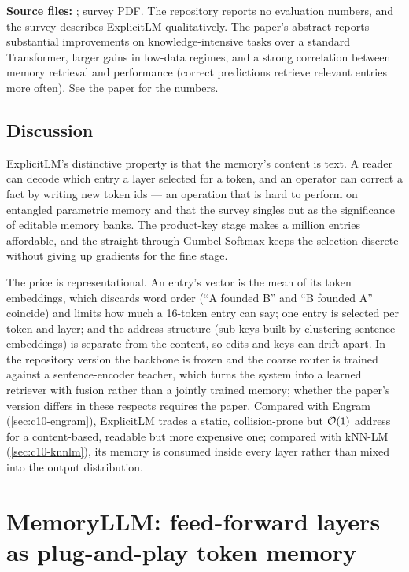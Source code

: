\begin{results}
\textbf{Source files:} ; survey PDF. The repository
reports no evaluation numbers, and the survey describes ExplicitLM qualitatively. The paper's
abstract reports substantial improvements on knowledge-intensive tasks over a standard Transformer,
larger gains in low-data regimes, and a strong correlation between memory retrieval and
performance (correct predictions retrieve relevant entries more often). See the paper for the
numbers.
\end{results}

\subsection{Discussion}

ExplicitLM's distinctive property is that the memory's content is text. A reader can decode which
entry a layer selected for a token, and an operator can correct a fact by writing new token ids ---
an operation that is hard to perform on entangled parametric memory and that the survey singles
out as the significance of editable memory banks. The product-key stage makes a million entries
affordable, and the straight-through Gumbel-Softmax keeps the selection discrete without giving up
gradients for the fine stage.

The price is representational. An entry's vector is the mean of its token embeddings, which
discards word order (``A founded B'' and ``B founded A'' coincide) and limits how much a 16-token
entry can say; one entry is selected per token and layer; and the address structure (sub-keys built
by clustering sentence embeddings) is separate from the content, so edits and keys can drift
apart. In the repository version the backbone is frozen and the coarse router is trained against a
sentence-encoder teacher, which turns the system into a learned retriever with fusion rather than
a jointly trained memory; whether the paper's version differs in these respects requires the paper.
Compared with Engram (\cref{sec:c10-engram}), ExplicitLM trades a static, collision-prone but
$\mathcal{O}(1)$ address for a content-based, readable but more expensive one; compared with kNN-LM
(\cref{sec:c10-knnlm}), its memory is consumed inside every layer rather than mixed into the output
distribution.

\section{MemoryLLM: feed-forward layers as plug-and-play token memory}\label{sec:c10-memoryllm}

